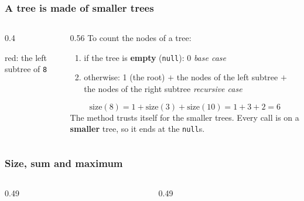 \documentclass[aspectratio=169,10pt,compress]{beamer}
\begin{document}
\begin{frame}[t,fragile] \frametitle{A tree is made of smaller trees}
  \begin{columns}[T]
    \begin{column}{0.4\textwidth}
      \begin{center}
      \end{center}
      \small red: the left subtree of \texttt{8}
    \end{column}
    \begin{column}{0.56\textwidth}
      To count the nodes of a tree:
      \begin{enumerate}\small
        \item if the tree is \textbf{empty} (\texttt{null}): 0 \hfill \emph{base case}
        \item otherwise: 1 (the root) $+$ the nodes of the left subtree $+$ the nodes of the right subtree \hfill \emph{recursive case}
      \end{enumerate}
      \[
      	\mathrm{size}(8) = 1 + \mathrm{size}(3) + \mathrm{size}(10) = 1 + 3 + 2 = 6
      \]
      \small The method trusts itself for the smaller trees. Every call is on a \textbf{smaller} tree, so it ends at the \texttt{null}s.
    \end{column}
  \end{columns}
\end{frame}




\begin{frame}[t,fragile] \frametitle{Size, sum and maximum}
  \begin{columns}[T]
    \begin{column}{0.49\textwidth}
    \end{column}
    \begin{column}{0.49\textwidth}
    \end{column}
  \end{columns}
\end{frame}
\end{document}
